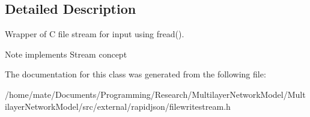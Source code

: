 \subsection{Detailed Description}
Wrapper of C file stream for input using fread(). 

\begin{DoxyNote}{Note}
implements Stream concept 
\end{DoxyNote}


The documentation for this class was generated from the following file\+:\begin{DoxyCompactItemize}
\item 
/home/mate/\+Documents/\+Programming/\+Research/\+Multilayer\+Network\+Model/\+Multilayer\+Network\+Model/src/external/rapidjson/filewritestream.\+h\end{DoxyCompactItemize}
